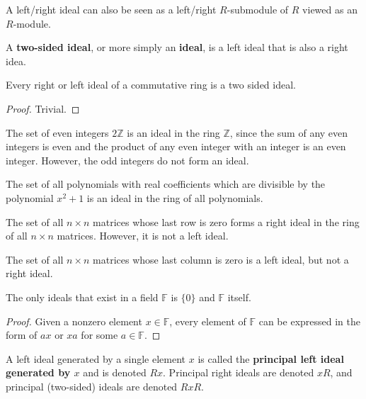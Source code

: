   A left/right ideal can also be seen as a left/right $R$-submodule of $R$ viewed as an $R$-module. 

  \begin{definition}
    A \textbf{two-sided ideal}, or more simply an \textbf{ideal}, is a left ideal that is also a right idea. 
  \end{definition}

  \begin{proposition}
    Every right or left ideal of a commutative ring is a two sided ideal. 
  \end{proposition}
  \begin{proof}
    Trivial. 
  \end{proof}

  \begin{example}
    The set of even integers $2 \mathbb{Z}$ is an ideal in the ring $\mathbb{Z}$, since the sum of any even integers is even and the product of any even integer with an integer is an even integer. However, the odd integers do not form an ideal. 
  \end{example}

  \begin{example}
    The set of all polynomials with real coefficients which are divisible by the polynomial $x^2 + 1$ is an ideal in the ring of all polynomials. 
  \end{example}

  \begin{example}
    The set of all $n \times n$ matrices whose last row is zero forms a right ideal in the ring of all $n \times n$ matrices. However, it is not a left ideal.

    The set of all $n\times n$ matrices whose last column is zero is a left ideal, but not a right ideal. 
  \end{example}

  \begin{proposition}
    The only ideals that exist in a field $\mathbb{F}$ is $\{0\}$ and $\mathbb{F}$ itself. 
  \end{proposition}
  \begin{proof}
    Given a nonzero element $x \in \mathbb{F}$, every element of $\mathbb{F}$ can be expressed in the form of $a x$ or $x a$ for some $a \in \mathbb{F}$. 
  \end{proof}

  \begin{definition}
    A left ideal generated by a single element $x$ is called the \textbf{principal left ideal generated by $x$} and is denoted $R x$. Principal right ideals are denoted $x R$, and principal (two-sided) ideals are denoted $R x R$. 
  \end{definition}

